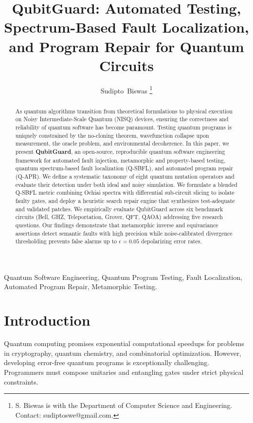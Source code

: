 \documentclass[10pt,journal,compsoc]{IEEEtran}
\title{QubitGuard: Automated Testing, Spectrum-Based Fault Localization, and Program Repair for Quantum Circuits}
\author{Sudipto~Biswas
\thanks{S. Biswas is with the Department of Computer Science and Engineering. Contact: sudiptoswe@gmail.com.}}
\begin{document}
\maketitle

\begin{abstract}
As quantum algorithms transition from theoretical formulations to physical execution on Noisy Intermediate-Scale Quantum (NISQ) devices, ensuring the correctness and reliability of quantum software has become paramount. Testing quantum programs is uniquely constrained by the no-cloning theorem, wavefunction collapse upon measurement, the oracle problem, and environmental decoherence. In this paper, we present \textbf{QubitGuard}, an open-source, reproducible quantum software engineering framework for automated fault injection, metamorphic and property-based testing, quantum spectrum-based fault localization (Q-SBFL), and automated program repair (Q-APR). We define a systematic taxonomy of eight quantum mutation operators and evaluate their detection under both ideal and noisy simulation. We formulate a blended Q-SBFL metric combining Ochiai spectra with differential sub-circuit slicing to isolate faulty gates, and deploy a heuristic search repair engine that synthesizes test-adequate and validated patches. We empirically evaluate QubitGuard across six benchmark circuits (Bell, GHZ, Teleportation, Grover, QFT, QAOA) addressing five research questions. Our findings demonstrate that metamorphic inverse and equivariance assertions detect semantic faults with high precision while noise-calibrated divergence thresholding prevents false alarms up to $\epsilon=0.05$ depolarizing error rates.
\end{abstract}

\begin{IEEEkeywords}
Quantum Software Engineering, Quantum Program Testing, Fault Localization, Automated Program Repair, Metamorphic Testing.
\end{IEEEkeywords}

\section{Introduction}
Quantum computing promises exponential computational speedups for problems in cryptography, quantum chemistry, and combinatorial optimization. However, developing error-free quantum programs is exceptionally challenging. Programmers must compose unitaries and entangling gates under strict physical constraints.
\end{document}
